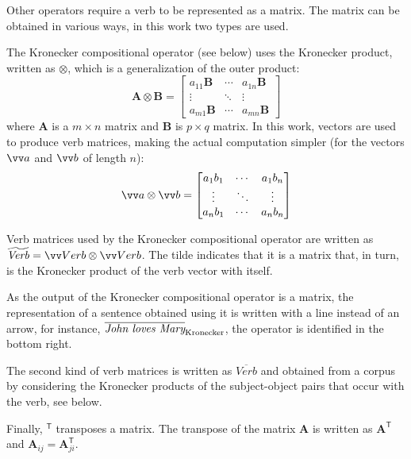 Other operators require a verb to be represented as a matrix. The matrix can be obtained in various ways, in this work two types are used.

The Kronecker compositional operator (see below) uses the Kronecker product, written as $\otimes$, which is a generalization of the outer product:
%
\begin{equation}
  \label{eq:kron-def}
 \mathbf{A}\otimes\mathbf{B} = \begin{bmatrix} a_{11} \mathbf{B} & \cdots & a_{1n}\mathbf{B} \\ \vdots & \ddots & \vdots \\ a_{m1} \mathbf{B} & \cdots & a_{mn} \mathbf{B} \end{bmatrix} 
\end{equation}
where $\mathbf{A}$ is a $m \times n$ matrix and $\mathbf{B}$ is $p \times q$ matrix. In this work, vectors are used to produce verb matrices, making the actual computation simpler (for the vectors $\ov{a}$ and $\ov{b}$ of length $n$):
\begin{equation}
  \label{eq:outer}
  \ov{a} \otimes \ov{b} = \begin{bmatrix} a_1b_1 & \cdots & a_1b_n\\ \vdots & \ddots & \vdots \\ a_nb_1 & \cdots & a_nb_n\end{bmatrix}
\end{equation}

Verb matrices used by the Kronecker compositional operator are written as $\widetilde{\mathit{Verb}} = \ov{Verb} \otimes \ov{Verb}$. The tilde indicates that it is a matrix that, in turn, is the Kronecker product of the verb vector with itself.

As the output of the Kronecker compositional operator is a matrix, the representation of a sentence obtained using it is written with a line instead of an arrow, for instance, $\overline{\text{\it John loves Mary}}_{\text{Kronecker}}$, the operator is identified in the bottom right.

The second kind of verb matrices is written as $\overline{Verb}$ and obtained from a corpus by considering the Kronecker products of the subject-object pairs that occur with the verb, see below.

Finally, $^{\mathsf{T}}$ transposes a matrix. The transpose of the matrix $\mathbf{A}$ is written as $\mathbf{A}^{\mathsf{T}}$ and $\mathbf{A}_{ij} = \mathbf{A}^{\mathsf{T}}_{ji}$.


